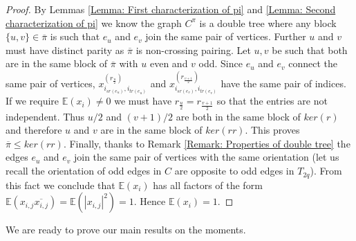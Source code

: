 \documentclass{article}
\theoremstyle{definition}
\newcommand{\E}{\mathbb{E}}
\begin{document}
{\begin{proof}
By Lemmas \ref{Lemma: First characterization of pi} and \ref{Lemma: Second characterization of pi} we know the graph $C^\pi$ is a double tree where any block $\{u,v\}\in\overline{\pi}$ is such that $e_u$ and $e_v$ join the same pair of vertices. Further $u$ and $v$ must have distinct parity as $\overline{\pi}$ is non-crossing pairing. Let $u,v$ be such that both are in the same block of $\overline{\pi}$ with $u$ even and $v$ odd. Since $e_u$ and $e_v$ connect the same pair of vertices, $x_{i_{sr(e_u)},i_{tr(e_u)}}^{(r_{\frac{u}{2}})}$ and $x_{i_{sr(e_v)},i_{tr(e_v)}}^{(r_{\frac{v+1}{2}})}$ have the same pair of indices. If we require $\E(x_i)\neq 0$ we must have $r_{\frac{u}{2}}=r_{\frac{v+1}{2}}$ so that the entries are not independent. Thus $u/2$ and $(v+1)/2$ are both in the same block of $ker(r)$ and therefore $u$ and $v$ are in the same block of $ker(rr)$. This proves $\overline{\pi}\leq ker(rr)$. Finally, thanks to Remark \ref{Remark: Properties of double tree} the edges $e_u$ and $e_v$ join the same pair of vertices with the same orientation (let us recall the orientation of odd edges in $C$ are opposite to odd edges in $T_{2q}$). From this fact we conclude that $\E(x_i)$ has all factors of the form $\E(x_{i,j}\overline{x_{i,j}})=\E(|x_{i,j}|^2)=1$. Hence $\E(x_i)=1$.
\end{proof}

We are ready to prove our main results on the moments.

}
\end{document}
